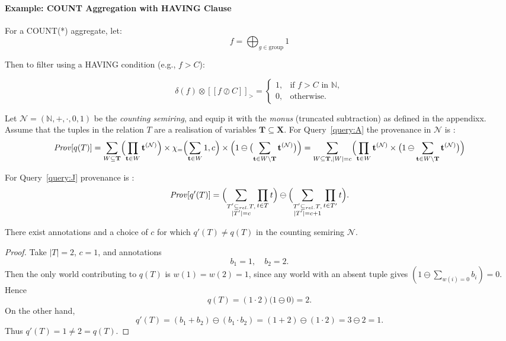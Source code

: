 \begin{toappendix}
\paragraph{Example: COUNT Aggregation with HAVING Clause}

For a COUNT(*) aggregate, let:
\[
f = \bigoplus_{g \in \text{group}} 1
\]

Then to filter using a HAVING condition (e.g., \( f > C \)):

\[
\delta(f) \otimes [[f \oslash C]]_{>} =
\begin{cases}
1, & \text{if } f > C \text{ in } \mathbb{N}, \\
0, & \text{otherwise.}
\end{cases}
\]

\end{toappendix}
Let $\mathcal{N} = (\mathbb{N},+,\cdot,0,1)$ be the \emph{counting semiring}, and equip it with the \emph{monus} (truncated subtraction) 
as defined in the appendixx. Assume that the tuples in the relation $T$ are a realisation of variables $\mathbf{T}\subseteq\mathbf{X}$.
For Query~\ref{query:A} the provenance in \(\mathcal{N}\) is :
\[
  \mathit{Prov}[q(T)]
  =
  \sum_{W\subseteq \mathbf{T}}
    \Bigl(\prod_{\mathbf{t}\in W}\mathbf{t}^{(\mathcal{N})}\Bigr)\times\chi_{=}\Bigl(\sum_{\mathbf{t}\in W} 1, c\Bigr)\times\Bigl(1 \ominus \bigl(\sum_{\mathbf{t}\in W\setminus \mathbf{T}}\mathbf{t}^{(\mathcal{N})}\bigr)\Bigr)
  =
  \sum_{W\subseteq \mathbf{T}, |W|=c}
    \Bigl(\prod_{\mathbf{t}\in W}\mathbf{t}^{(\mathcal{N})}\times\bigl(1\ominus\sum_{\mathbf{t}\in W\setminus \mathbf{T}}\mathbf{t}^{(\mathcal{N})}\bigr)\Bigr)
\]

For Query~\ref{query:J} provenance is :
\[
  \mathit{Prov}[q'(T)]
  =
  \Bigl(\sum_{\substack{T'\subseteq_{rel.}T ,\\|T'|=c}}\prod_{t\in T}t\Bigr)
  \ominus
  \Bigl(\sum_{\substack{T'\subseteq_{rel.}T,\\|T'|=c+1}}\prod_{t\in T'}t\Bigr).
\]

\begin{proposition}
There exist annotations and a choice of \(c\) for which
\(q'(T)\neq q(T)\)
in the counting semiring \(\mathcal{N}\).
\end{proposition}

\begin{proof}
Take \(\lvert T\rvert=2\), \(c=1\), and annotations
\[
  b_1 = 1,\quad b_2 = 2.
\]
Then the only world contributing to \(q(T)\) is \(w(1)=w(2)=1\), since any world with an absent tuple gives
\((1\ominus\sum_{w(i)=0}b_i)=0\).  Hence
\[
  q(T)
  = (1\cdot2)\bigl(1\ominus0\bigr)
  = 2.
\]
On the other hand,
\[
  q'(T)
  = (b_1+b_2)\ominus(b_1\cdot b_2)
  = (1+2)\ominus(1\cdot2)
  = 3\ominus2
  = 1.
\]
Thus \(q'(T)=1\neq2=q(T)\).
\end{proof}

